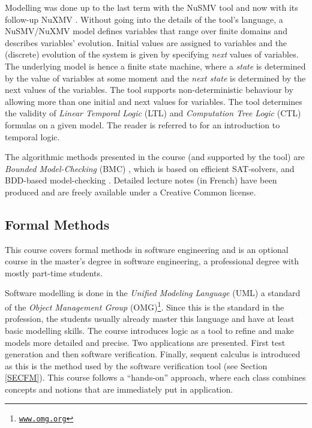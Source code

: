 \documentclass[a4paper,UKenglish]{lipics}
\begin{document}
Modelling was done up to the last term with the NuSMV tool \cite{acemcegfgmpmrrsat02,NuSMVman24} and now with its follow-up NuXMV \cite{NuXMVman10}. Without going into the details of the tool's language, a NuSMV/NuXMV model defines variables that range over finite domains and describes variables' evolution. Initial values are assigned to variables and the (discrete) evolution of the system is given by specifying \emph{next} values of variables. The underlying model is hence a finite state machine, where a \emph{state} is determined by the value of variables at some moment and the \emph{next state} is determined by the next values of the variables. The tool supports non-deterministic behaviour by allowing more than one initial and next values for variables. The tool determines the validity of \emph{Linear Temporal Logic} (LTL) and \emph{Computation Tree Logic} (CTL) formulas on a given model. The reader is referred to \cite{eaeHTCSB_1990} for an introduction to temporal logic.

The algorithmic methods presented in the course (and supported by the tool) are \emph{Bounded Model-Checking} (BMC) \cite{abacemcyzTACAS99}, which is based on efficient SAT-solvers, and BDD-based model-checking \cite{jrbemcklmdldljhIC_98_2_1992}. Detailed lecture notes (in French) have been produced \cite{rvMV2013} and are freely available under a Creative Common license.




\subsection{Formal Methods}\label{SUBSECFM}
This course covers formal methods in software engineering and is an optional course in the master's degree in software engineering, a professional degree with mostly part-time students.

Software modelling is done in the \emph{Unified Modeling Language} (UML) a standard of the \emph{Object Management Group} (OMG)\footnote{\href{http://www.omg.org}{\nolinkurl{www.omg.org}}}. Since this is the standard in the profession, the students usually already master this language and have at least basic modelling skills. The course introduces logic as a tool to refine and make models more detailed and precise. Two applications are presented. First test generation and then software verification. Finally, sequent calculus is introduced as this is the method used by the software verification tool (see Section \ref{SECFM}). This course follows a ``hands-on'' approach, where each class combines concepts and notions that are immediately put in application.
\end{document}
